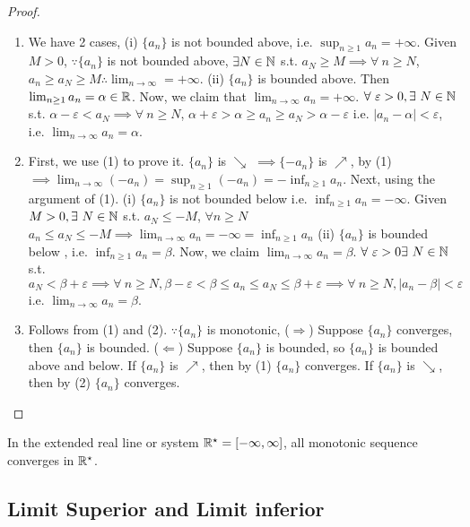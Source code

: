 	\begin{proof}$ $
		\begin{enumerate}
		\item We have 2 cases, (i) $\{a_n\}$ is not bounded above, i.e. $\sup_{n \geq 1} a_n = +\infty$. Given $M > 0$, $\because \{a_n\}$ is not bounded above, $\exists N \in \mathbb{N}$ s.t. $a_N \geq M \implies \forall\ n \geq N$, $a_n\geq a_N \geq M \therefore \lim_{n\to\infty } = +\infty$. (ii) $\{a_n\}$ is bounded above. Then $\lim_{n\geq 1}a_n = \alpha\in \mathbb{R}$. Now, we claim that $\lim_{n\to\infty}a_n = +\infty$. $\forall\ \varepsilon > 0,  \exists\ N\in\N$ s.t. $\alpha - \varepsilon < a_N \implies \forall\ n\geq N$, $\alpha +\varepsilon > \alpha \geq a_n\geq a_N > \alpha-\varepsilon$ i.e. $|a_n-\alpha| < \varepsilon$, i.e. $\lim_{n\to\infty} a_n = \alpha$.
		\item First, we use (1) to prove it. $\{a_n\}$ is $\searrow$ $\implies\{-a_n\}$ is $\nearrow$, by (1) $\implies \lim_{n\to\infty}(-a_n) = \sup_{n \geq 1}(-a_n) = -\inf_{n \geq 1} a_n$. Next, using the argument of (1). (i) $\{a_n\}$ is not bounded below i.e. $\inf_{n \geq 1}a_n = -\infty$. Given $M > 0, \exists\ N\in\mathbb{N} $ s.t. $a_N \leq -M$, $\forall n\geq N$ $a_n \leq a_N \leq -M \implies \lim_{n\to\infty}a_n = - \infty =\inf_{n\geq 1}a_n$ (ii) $\{a_n\}$ is bounded below , i.e. $\inf_{n\geq 1}a_n = \beta$. Now, we claim $\lim_{n\to\infty}a_n = \beta$. $\forall\ \varepsilon> 0\exists\ N\in\N$ s.t. $a_N < \beta + \varepsilon\implies\forall\ n\geq N , \beta-\varepsilon<\beta\leq a_n\leq a_N\leq \beta+\varepsilon\implies\forall\ n\geq N, |a_n-\beta|<\varepsilon$ i.e. $\lim_{n\to\infty}a_n = \beta$.
		\item Follows from (1) and (2). $\because \{a_n\}$ is monotonic, ($\Rightarrow$) Suppose $\{a_n\}$ converges, then $\{a_n\}$ is bounded. ($\Leftarrow$) Suppose $\{a_n\}$ is bounded, so $\{a_n\}$ is bounded above and below. If $\{a_n\}$ is $\nearrow$, then by (1) $\{a_n\}$ converges. If $\{a_n\}$ is $\searrow$, then by (2) $\{a_n\}$ converges.    
	\end{enumerate}
	\end{proof}

	\begin{rmk*}
	In the extended real line or system $\mathbb{R}^{\star} = [-\infty,\infty]$, all monotonic sequence converges in $\mathbb{R}^{\star}$.
	\end{rmk*}

\subsection{Limit Superior and Limit inferior}

